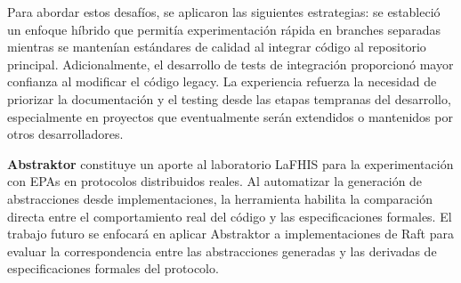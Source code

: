 \documentclass[12pt]{article}
\begin{document}
Para abordar estos desafíos, se aplicaron las siguientes estrategias: se estableció un enfoque híbrido que permitía experimentación rápida en branches separadas mientras se mantenían estándares de calidad al integrar código al repositorio principal. Adicionalmente, el desarrollo de tests de integración proporcionó mayor confianza al modificar el código legacy. La experiencia refuerza la necesidad de priorizar la documentación y el testing desde las etapas tempranas del desarrollo, especialmente en proyectos que eventualmente serán extendidos o mantenidos por otros desarrolladores.

\textbf{Abstraktor} constituye un aporte al laboratorio LaFHIS para la experimentación con EPAs en protocolos distribuidos reales. Al automatizar la generación de abstracciones desde implementaciones, la herramienta habilita la comparación directa entre el comportamiento real del código y las especificaciones formales. El trabajo futuro se enfocará en aplicar Abstraktor a implementaciones de Raft para evaluar la correspondencia entre las abstracciones generadas y las derivadas de especificaciones formales del protocolo.


\clearpage



\end{document}

